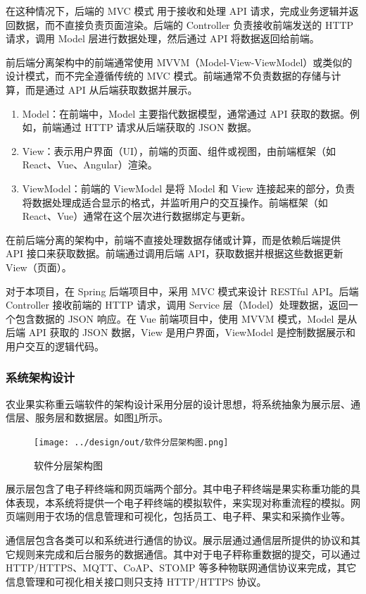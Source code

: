 \documentclass{xduugmr}
\begin{document}
在这种情况下，后端的 MVC 模式 用于接收和处理 API 请求，完成业务逻辑并返回数据，而不直接负责页面渲染。后端的 Controller 负责接收前端发送的 HTTP 请求，调用 Model 层进行数据处理，然后通过 API 将数据返回给前端。

前后端分离架构中的前端通常使用 MVVM（Model-View-ViewModel）或类似的设计模式，而不完全遵循传统的 MVC 模式。前端通常不负责数据的存储与计算，而是通过 API 从后端获取数据并展示。
\begin{enumerate}
    \item Model：在前端中，Model 主要指代数据模型，通常通过 API 获取的数据。例如，前端通过 HTTP 请求从后端获取的 JSON 数据。
    \item View：表示用户界面（UI），前端的页面、组件或视图，由前端框架（如 React、Vue、Angular）渲染。
    \item ViewModel：前端的 ViewModel 是将 Model 和 View 连接起来的部分，负责将数据处理成适合显示的格式，并监听用户的交互操作。前端框架（如 React、Vue）通常在这个层次进行数据绑定与更新。
\end{enumerate}

在前后端分离的架构中，前端不直接处理数据存储或计算，而是依赖后端提供 API 接口来获取数据。前端通过调用后端 API，获取数据并根据这些数据更新 View（页面）。

对于本项目，在 Spring 后端项目中，采用 MVC 模式来设计 RESTful API。后端 Controller 接收前端的 HTTP 请求，调用 Service 层（Model）处理数据，返回一个包含数据的 JSON 响应。在 Vue 前端项目中，使用 MVVM 模式，Model 是从后端 API 获取的 JSON 数据，View 是用户界面，ViewModel 是控制数据展示和用户交互的逻辑代码。

\subsubsection{系统架构设计}

农业果实称重云端软件的架构设计采用分层的设计思想，将系统抽象为展示层、通信层、服务层和数据层。如图\ref{fig:软件分层架构图}所示。

\begin{figure}[H]
    \centering
    \texttt{[image: ../design/out/软件分层架构图.png]}
    \caption{软件分层架构图}
    \label{fig:软件分层架构图}
\end{figure}

展示层包含了电子秤终端和网页端两个部分。其中电子秤终端是果实称重功能的具体表现，本系统将提供一个电子秤终端的模拟软件，来实现对称重流程的模拟。网页端则用于农场的信息管理和可视化，包括员工、电子秤、果实和采摘作业等。

通信层包含各类可以和系统进行通信的协议。展示层通过通信层所提供的协议和其它规则来完成和后台服务的数据通信。其中对于电子秤称重数据的提交，可以通过 HTTP/HTTPS、MQTT、CoAP、STOMP 等多种物联网通信协议来完成，其它信息管理和可视化相关接口则只支持 HTTP/HTTPS 协议。
\end{document}
